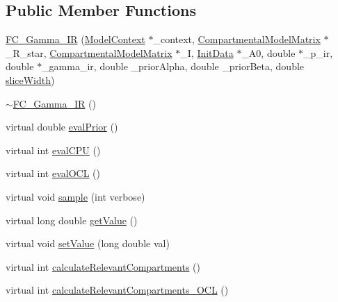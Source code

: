 \subsection*{Public Member Functions}
\begin{DoxyCompactItemize}
\item 
\hyperlink{classSpatialSEIR_1_1FC__Gamma__IR_ae561d9627dbbd79c3ed2140daebf7130}{F\-C\-\_\-\-Gamma\-\_\-\-I\-R} (\hyperlink{classSpatialSEIR_1_1ModelContext}{Model\-Context} $\ast$\-\_\-context, \hyperlink{classSpatialSEIR_1_1CompartmentalModelMatrix}{Compartmental\-Model\-Matrix} $\ast$\-\_\-\-R\-\_\-star, \hyperlink{classSpatialSEIR_1_1CompartmentalModelMatrix}{Compartmental\-Model\-Matrix} $\ast$\-\_\-\-I, \hyperlink{classSpatialSEIR_1_1InitData}{Init\-Data} $\ast$\-\_\-\-A0, double $\ast$\-\_\-p\-\_\-ir, double $\ast$\-\_\-gamma\-\_\-ir, double \-\_\-prior\-Alpha, double \-\_\-prior\-Beta, double \hyperlink{classSpatialSEIR_1_1FullConditional_a150ee031af8d086ad0a04b13630a110f}{slice\-Width})
\item 
\hyperlink{classSpatialSEIR_1_1FC__Gamma__IR_a749dee0018d26639f5973884bea96e0c}{$\sim$\-F\-C\-\_\-\-Gamma\-\_\-\-I\-R} ()
\item 
virtual double \hyperlink{classSpatialSEIR_1_1FC__Gamma__IR_a3615e9760812f273c3ccf901d5924c4a}{eval\-Prior} ()
\item 
virtual int \hyperlink{classSpatialSEIR_1_1FC__Gamma__IR_ac52b633a7878870a2e1adf059fb3c2ea}{eval\-C\-P\-U} ()
\item 
virtual int \hyperlink{classSpatialSEIR_1_1FC__Gamma__IR_a3423d47b7728892497a94407ecc37730}{eval\-O\-C\-L} ()
\item 
virtual void \hyperlink{classSpatialSEIR_1_1FC__Gamma__IR_a1067c9b99b419d8c9d3566a5eb4b6d73}{sample} (int verbose)
\item 
virtual long double \hyperlink{classSpatialSEIR_1_1FC__Gamma__IR_a0895a64e8292e75141a4ad9ed1145e9d}{get\-Value} ()
\item 
virtual void \hyperlink{classSpatialSEIR_1_1FC__Gamma__IR_a8517282f2fc24d52a00a426aa414f237}{set\-Value} (long double val)
\item 
virtual int \hyperlink{classSpatialSEIR_1_1FC__Gamma__IR_acdeddf0a6d53d2f10e7a12edf3924383}{calculate\-Relevant\-Compartments} ()
\item 
virtual int \hyperlink{classSpatialSEIR_1_1FC__Gamma__IR_a200f28e508a37bd50a8a0155fcd467c6}{calculate\-Relevant\-Compartments\-\_\-\-O\-C\-L} ()
\end{DoxyCompactItemize}
